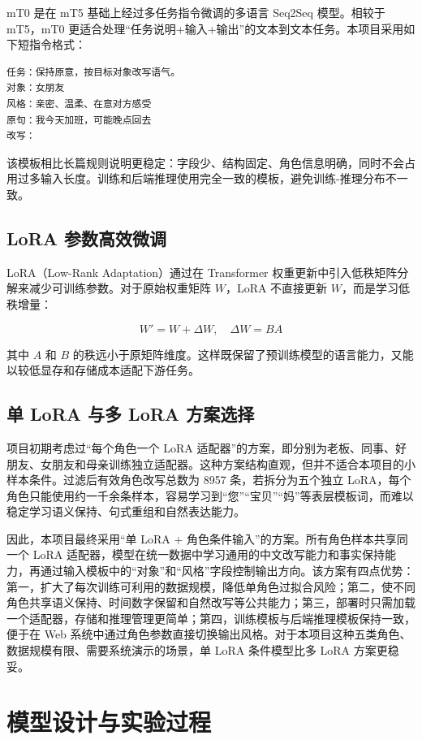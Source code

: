 \documentclass[12pt,a4paper]{ctexart}
\begin{document}
mT0 是在 mT5 基础上经过多任务指令微调的多语言 Seq2Seq 模型。相较于 mT5，mT0 更适合处理“任务说明+输入+输出”的文本到文本任务。本项目采用如下短指令格式：

\begin{lstlisting}[language={},caption={mT0 输入模板}]
任务：保持原意，按目标对象改写语气。
对象：女朋友
风格：亲密、温柔、在意对方感受
原句：我今天加班，可能晚点回去
改写：
\end{lstlisting}

该模板相比长篇规则说明更稳定：字段少、结构固定、角色信息明确，同时不会占用过多输入长度。训练和后端推理使用完全一致的模板，避免训练-推理分布不一致。

\subsection{LoRA 参数高效微调}

LoRA（Low-Rank Adaptation）通过在 Transformer 权重更新中引入低秩矩阵分解来减少可训练参数。对于原始权重矩阵 $W$，LoRA 不直接更新 $W$，而是学习低秩增量：

\[
W' = W + \Delta W,\quad \Delta W = BA
\]

其中 $A$ 和 $B$ 的秩远小于原矩阵维度。这样既保留了预训练模型的语言能力，又能以较低显存和存储成本适配下游任务。

\subsection{单 LoRA 与多 LoRA 方案选择}

项目初期考虑过“每个角色一个 LoRA 适配器”的方案，即分别为老板、同事、好朋友、女朋友和母亲训练独立适配器。这种方案结构直观，但并不适合本项目的小样本条件。过滤后有效角色改写总数为 8957 条，若拆分为五个独立 LoRA，每个角色只能使用约一千余条样本，容易学习到“您”“宝贝”“妈”等表层模板词，而难以稳定学习语义保持、句式重组和自然表达能力。

因此，本项目最终采用“单 LoRA + 角色条件输入”的方案。所有角色样本共享同一个 LoRA 适配器，模型在统一数据中学习通用的中文改写能力和事实保持能力，再通过输入模板中的“对象”和“风格”字段控制输出方向。该方案有四点优势：第一，扩大了每次训练可利用的数据规模，降低单角色过拟合风险；第二，使不同角色共享语义保持、时间数字保留和自然改写等公共能力；第三，部署时只需加载一个适配器，存储和推理管理更简单；第四，训练模板与后端推理模板保持一致，便于在 Web 系统中通过角色参数直接切换输出风格。对于本项目这种五类角色、数据规模有限、需要系统演示的场景，单 LoRA 条件模型比多 LoRA 方案更稳妥。

\section{模型设计与实验过程}
\end{document}
